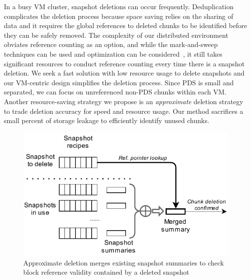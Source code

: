 In a busy VM cluster, snapshot deletions can occur frequently.
Deduplication complicates the deletion process because space saving relies on the sharing of data
and it requires the global references to deleted chunks to be identified before they can be safely removed.
The complexity of our distributed environment obviates reference counting as an option,
and while the mark-and-sweep techniques can be used and optimization can be considered~\cite{Fabiano2013},
it still takes significant resources to conduct reference counting every time there is a snapshot deletion.
%
We seek a fast solution with low resource usage to delete snapshots and
our VM-centric design simplifies the deletion process. 
Since PDS is small and separated, we can focus on unreferenced non-PDS chunks within each VM. 
Another resource-saving strategy we propose is
an {\em approximate} deletion strategy to trade deletion accuracy for
speed and resource usage. Our method sacrifices a small percent of storage leakage
to efficiently identify unused chunks.

\begin{figure}
  \centering
  \includegraphics{images/deletion.pdf}
  \caption{Approximate deletion merges existing snapshot summaries to check block reference validity contained by a deleted snapshot}
  \label{fig:deletion_flow}
\end{figure}

